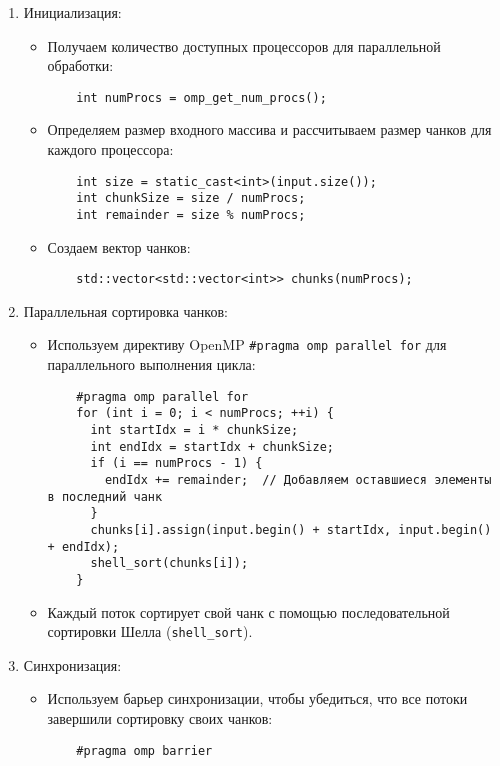 \documentclass[]{article}
\theoremstyle{remark}
\theoremstyle{definition}
\newcommand{\cpp}[1]{\texttt{#1}}
\begin{document}
\begin{enumerate}
    \item Инициализация:
    \begin{itemize}
        \item Получаем количество доступных процессоров для параллельной обработки:
        \begin{verbatim}
    int numProcs = omp_get_num_procs();
        \end{verbatim}

        \item Определяем размер входного массива и рассчитываем размер чанков для каждого процессора:
        \begin{verbatim}
    int size = static_cast<int>(input.size());
    int chunkSize = size / numProcs;
    int remainder = size % numProcs;
        \end{verbatim}

        \item Создаем вектор чанков:
        \begin{verbatim}
    std::vector<std::vector<int>> chunks(numProcs);
        \end{verbatim}
    \end{itemize}

    \item Параллельная сортировка чанков:
    \begin{itemize}
        \item Используем директиву OpenMP \cpp{#pragma omp parallel for} для параллельного выполнения цикла:
        \begin{verbatim}
    #pragma omp parallel for
    for (int i = 0; i < numProcs; ++i) {
      int startIdx = i * chunkSize;
      int endIdx = startIdx + chunkSize;
      if (i == numProcs - 1) {
        endIdx += remainder;  // Добавляем оставшиеся элементы в последний чанк
      }
      chunks[i].assign(input.begin() + startIdx, input.begin() + endIdx);
      shell_sort(chunks[i]);
    }
        \end{verbatim}
        
        \item Каждый поток сортирует свой чанк с помощью последовательной сортировки Шелла (\cpp{shell_sort}).
    \end{itemize}
    \item Синхронизация:
    \begin{itemize}
        \item Используем барьер синхронизации, чтобы убедиться, что все потоки завершили сортировку своих чанков:
        \begin{verbatim}
    #pragma omp barrier
        \end{verbatim}
    \end{itemize}
    

\end{enumerate}
\end{document}
